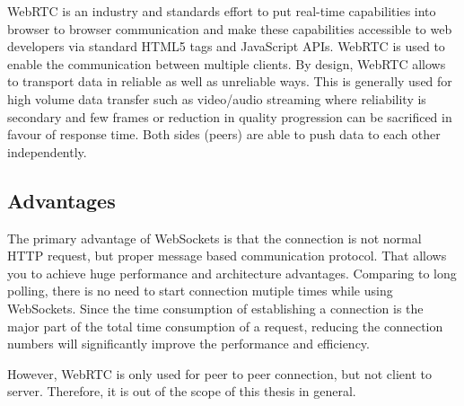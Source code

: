 WebRTC is an industry and standards effort to put real-time capabilities into browser to browser communication and make these capabilities accessible to web developers via standard HTML5 tags and JavaScript APIs\cite{johnston2012webrtc}. 
WebRTC is used to enable the communication between multiple clients. By design, WebRTC allows to transport data in reliable as well as unreliable ways. This is generally used for high volume data transfer such as video/audio streaming where reliability is secondary and few frames or reduction in quality progression can be sacrificed in favour of response time. Both sides (peers) are able to push data to each other independently.

\subsection{Advantages}

The primary advantage of WebSockets is that the connection is not normal HTTP request, but proper message based communication protocol. That allows you to achieve huge performance and architecture advantages. Comparing to long polling, there is no need to start connection mutiple times while using WebSockets. Since the time consumption of establishing a connection is the major part of the total time consumption of a request, reducing the connection numbers will significantly improve the performance and efficiency. 

However, WebRTC is only used for peer to peer connection, but not client to server. Therefore, it is out of the scope of this thesis in general.